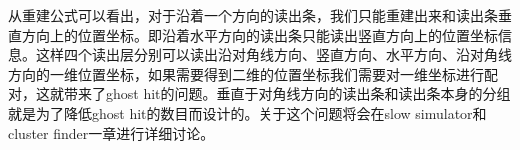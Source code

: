 从重建公式可以看出，对于沿着一个方向的读出条，我们只能重建出来和读出条垂直方向上的位置坐标。即沿着水平方向的读出条只能读出竖直方向上的位置坐标信息。这样四个读出层分别可以读出沿对角线方向、竖直方向、水平方向、沿对角线方向的一维位置坐标，如果需要得到二维的位置坐标我们需要对一维坐标进行配对，这就带来了ghost hit的问题。垂直于对角线方向的读出条和读出条本身的分组就是为了降低ghost hit的数目而设计的。关于这个问题将会在slow simulator和cluster finder一章进行详细讨论。